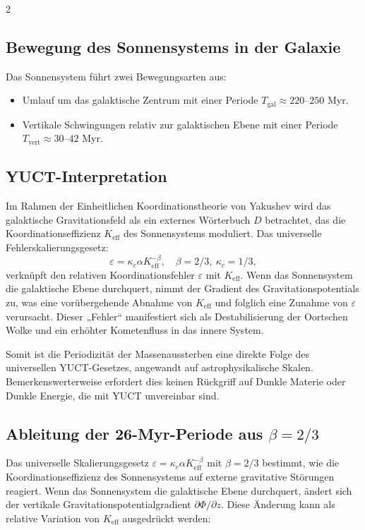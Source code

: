 \documentclass[11pt,a4paper]{article}
\begin{document}
\begin{multicols}{2}
		\subsection{Bewegung des Sonnensystems in der Galaxie}
		
		Das Sonnensystem führt zwei Bewegungsarten aus:
		\begin{itemize}
			\item Umlauf um das galaktische Zentrum mit einer Periode \(T_{\text{gal}} \approx 220\)–\(250\) Myr.
			\item Vertikale Schwingungen relativ zur galaktischen Ebene mit einer Periode \(T_{\text{vert}} \approx 30\)–\(42\) Myr.
		\end{itemize}
		
		\subsection{YUCT-Interpretation}
		
		Im Rahmen der Einheitlichen Koordinationstheorie von Yakushev wird das galaktische Gravitationsfeld als ein externes Wörterbuch \(D\) betrachtet, das die Koordinationseffizienz \(K_{\mathrm{eff}}\) des Sonnensystems moduliert. Das universelle Fehlerskalierungsgesetz:
		\[
		\varepsilon = \kappa_c \alpha K_{\mathrm{eff}}^{-\beta},\quad \beta = 2/3,\ \kappa_c = 1/3,
		\]
		verknüpft den relativen Koordinationsfehler \(\varepsilon\) mit \(K_{\mathrm{eff}}\). Wenn das Sonnensystem die galaktische Ebene durchquert, nimmt der Gradient des Gravitationspotentials zu, was eine vorübergehende Abnahme von \(K_{\mathrm{eff}}\) und folglich eine Zunahme von \(\varepsilon\) verursacht. Dieser „Fehler“ manifestiert sich als Destabilisierung der Oortschen Wolke und ein erhöhter Kometenfluss in das innere System.
		
		Somit ist die Periodizität der Massenaussterben eine direkte Folge des universellen YUCT-Gesetzes, angewandt auf astrophysikalische Skalen. Bemerkenswerterweise erfordert dies keinen Rückgriff auf Dunkle Materie oder Dunkle Energie, die mit YUCT unvereinbar sind.
		
		\subsection{Ableitung der 26-Myr-Periode aus \(\beta = 2/3\)}
		
		Das universelle Skalierungsgesetz $\varepsilon = \kappa_c \alpha K_{\mathrm{eff}}^{-\beta}$ mit $\beta = 2/3$ bestimmt, wie die Koordinationseffizienz des Sonnensystems auf externe gravitative Störungen reagiert. Wenn das Sonnensystem die galaktische Ebene durchquert, ändert sich der vertikale Gravitationspotentialgradient $\partial \Phi / \partial z$. Diese Änderung kann als relative Variation von $K_{\mathrm{eff}}$ ausgedrückt werden:
		

\end{multicols}
\end{document}
